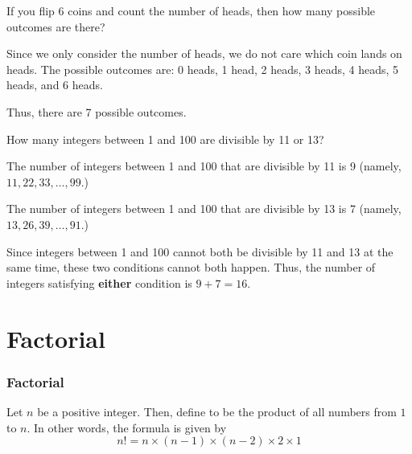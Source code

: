 \begin{frame}[t]
\begin{ex}
If you flip 6 coins and count the number of heads, then how many possible outcomes are there?
\end{ex}
\begin{sol}
Since we only consider the number of heads, we do not care which coin lands on heads. \pa The possible outcomes are: 0 heads, 1 head, 2 heads, 3 heads, 4 heads, 5 heads, and 6 heads. \pa

\medskip
Thus, there are 7 possible outcomes.
\end{sol}
\end{frame}


\begin{frame}[t]
\begin{ex}
How many integers between 1 and 100 are divisible by 11 or 13?
\end{ex}
\begin{sol}
The number of integers between 1 and 100 that are divisible by 11 is 9 (namely, $11, 22, 33, \ldots, 99$.)
\bigskip

The number of integers between 1 and 100 that are divisible by 13 is 7 (namely, $13, 26, 39, \ldots, 91$.)
\bigskip

Since integers between 1 and 100 cannot both be divisible by 11 and 13 at the same time, these two conditions cannot both happen. Thus, the number of integers satisfying \textbf{either} condition is $9 + 7 = 16$.
\end{sol}
\end{frame}

\section{Factorial}
\frame{\sectionpage}

\begin{frame}
\frametitle{Factorial}
\begin{defn}{}{}
Let $n$ be a positive integer. Then, define  to be the product of all numbers from $1$ to $n$. In other words, the formula is given by
\begin{equation}
n! = n \times (n-1) \times (n-2) \times 2 \times 1
\end{equation}
\end{defn}
\end{frame}


